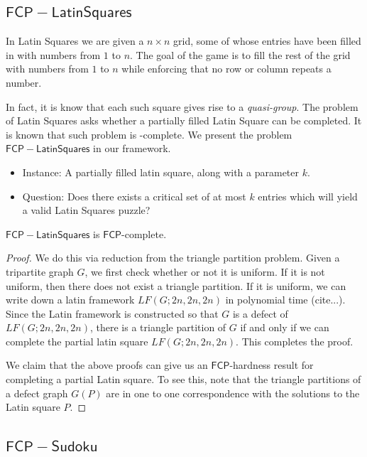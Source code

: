 \documentclass[runningheads,a4paper]{llncs}
\begin{document}
\subsection{$\mathsf{FCP-LatinSquares}$}

In Latin Squares we are given a $n \times n$ grid, some of whose entries have been filled in with numbers from $1$ to $n$. The goal of the game is to fill the rest of the grid with numbers from $1$ to $n$ while enforcing that no row or column repeats a number. 

In fact, it is know that each such square gives rise to a \emph{quasi-group}. The problem of Latin Squares asks whether a partially filled Latin Square can be completed. It is known that such problem is \NP-complete. We present the problem $\mathsf{FCP-Latin Squares}$ in our framework.

\begin{itemize}
\item Instance: A partially filled latin square, along with a parameter $k$. 
\item Question: Does there exists a critical set of at most  $k$ entries which will yield a valid Latin Squares puzzle?
\end{itemize}


\begin{theorem}
$\mathsf{FCP-Latin Squares}$ is $\mathsf{FCP}$-complete.
\end{theorem}

\begin{proof}
We do this via reduction from the triangle partition problem. Given a tripartite graph $G$, we first check whether or not it is uniform. If it is not uniform, then there does not exist a triangle partition. If it is uniform, we can write down a latin framework $LF(G;2n,2n,2n)$ in polynomial time (cite...). Since the Latin framework is constructed so that $G$ is a defect of $LF(G;2n,2n,2n)$, there is a triangle partition of $G$ if and only if we can complete the partial latin square $LF(G;2n,2n,2n)$. This completes the proof.

We claim that the above proofs can give us an $\mathsf{FCP}$-hardness result for completing a partial Latin square. To see this, note that the triangle partitions of a defect graph $G(P)$ are in one to one correspondence with the solutions to the Latin square $P$.
\end{proof}

\subsection{$\mathsf{FCP-Sudoku}$}
\end{document}
